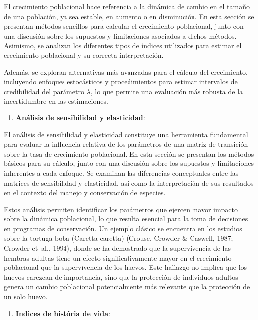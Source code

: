 \documentclass[
  12pt,
  letterpaper,
]{book}
\providecommand{\tightlist}{%
  \setlength{\itemsep}{0pt}\setlength{\parskip}{0pt}}\usepackage{longtable,booktabs,array}
\begin{document}
El crecimiento poblacional hace referencia a la dinámica de cambio en el
tamaño de una población, ya sea estable, en aumento o en disminución. En
esta sección se presentan métodos sencillos para calcular el crecimiento
poblacional, junto con una discusión sobre los supuestos y limitaciones
asociados a dichos métodos. Asimismo, se analizan los diferentes tipos
de índices utilizados para estimar el crecimiento poblacional y su
correcta interpretación.

Además, se exploran alternativas más avanzadas para el cálculo del
crecimiento, incluyendo enfoques estocásticos y procedimientos para
estimar intervalos de credibilidad del parámetro \(\lambda\), lo que
permite una evaluación más robusta de la incertidumbre en las
estimaciones.

\begin{enumerate}
\def\labelenumi{\arabic{enumi}.}
\setcounter{enumi}{7}
\tightlist
\item
  \textbf{Análisis de sensibilidad y elasticidad}:
\end{enumerate}

El análisis de sensibilidad y elasticidad constituye una herramienta
fundamental para evaluar la influencia relativa de los parámetros de una
matriz de transición sobre la tasa de crecimiento poblacional. En esta
sección se presentan los métodos básicos para su cálculo, junto con una
discusión sobre los supuestos y limitaciones inherentes a cada enfoque.
Se examinan las diferencias conceptuales entre las matrices de
sensibilidad y elasticidad, así como la interpretación de sus resultados
en el contexto del manejo y conservación de especies.

Estos análisis permiten identificar los parámetros que ejercen mayor
impacto sobre la dinámica poblacional, lo que resulta esencial para la
toma de decisiones en programas de conservación. Un ejemplo clásico se
encuentra en los estudios sobre la tortuga boba (Caretta caretta)
(Crouse, Crowder \& Caswell, 1987; Crowder et~al., 1994), donde se ha
demostrado que la supervivencia de las hembras adultas tiene un efecto
significativamente mayor en el crecimiento poblacional que la
supervivencia de los huevos. Este hallazgo no implica que los huevos
carezcan de importancia, sino que la protección de individuos adultos
genera un cambio poblacional potencialmente más relevante que la
protección de un solo huevo.

\begin{enumerate}
\def\labelenumi{\arabic{enumi}.}
\setcounter{enumi}{8}
\tightlist
\item
  \textbf{Indices de história de vida}:
\end{enumerate}
\end{document}
